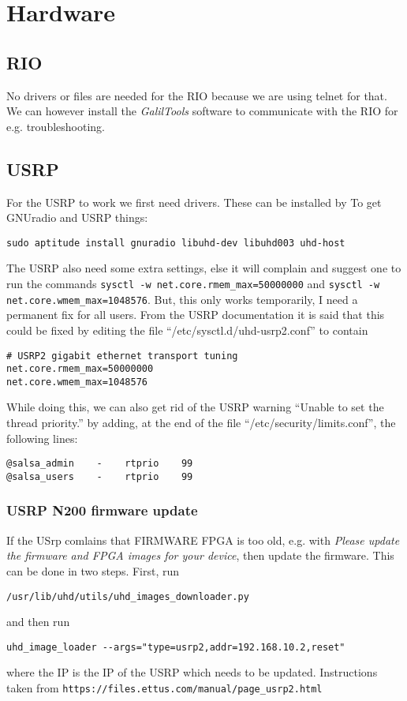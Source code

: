 \section{Hardware}
\subsection{RIO}
No drivers or files are needed for the RIO because we are using telnet for
that. We can however install the \emph{GalilTools} software to communicate
with the RIO for e.g. troubleshooting.

\subsection{USRP}
For the USRP to work we first need drivers. These can be installed by
To get GNUradio and USRP things: 
\begin{verbatim}
sudo aptitude install gnuradio libuhd-dev libuhd003 uhd-host
\end{verbatim}

The USRP also need some extra settings, else it will complain and suggest one
to run the commands 
\verb!sysctl -w net.core.rmem_max=50000000! and 
\verb!sysctl -w net.core.wmem_max=1048576!. But, this only works
temporarily, I need a permanent fix for all users. From the USRP documentation
it is said that this could be fixed by editing the file
“/etc/sysctl.d/uhd-usrp2.conf” to contain
\begin{verbatim}
# USRP2 gigabit ethernet transport tuning
net.core.rmem_max=50000000
net.core.wmem_max=1048576
\end{verbatim}
While doing this, we can also get rid of the USRP warning “Unable to set the
thread priority.” by adding, at the end of the file
“/etc/security/limits.conf”, the following lines: 
\begin{verbatim}
@salsa_admin    -    rtprio    99
@salsa_users    -    rtprio    99
\end{verbatim}

\subsubsection{USRP N200 firmware update}
If the USrp comlains that FIRMWARE FPGA is too old, e.g. with \emph{Please update the firmware and FPGA images for your device}, then update the firmware. This can be done in two steps. First, run
\begin{verbatim}
/usr/lib/uhd/utils/uhd_images_downloader.py
\end{verbatim}
and then run 
\begin{verbatim}
uhd_image_loader --args="type=usrp2,addr=192.168.10.2,reset"
\end{verbatim}
where the IP is the IP of the USRP which needs to be updated. Instructions
taken from \verb!https://files.ettus.com/manual/page_usrp2.html!

